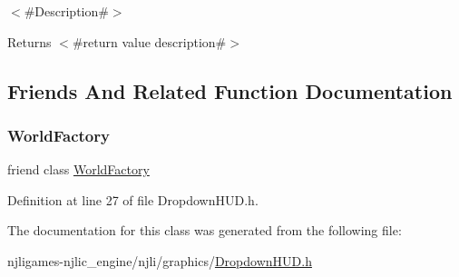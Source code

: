 $<$\#\+Description\#$>$

\begin{DoxyReturn}{Returns}
$<$\#return value description\#$>$ 
\end{DoxyReturn}


\subsection{Friends And Related Function Documentation}
\mbox{\label{classnjli_1_1_dropdown_h_u_d_acb96ebb09abe8f2a37a915a842babfac}} 
\subsubsection{\texorpdfstring{World\+Factory}{WorldFactory}}
{\footnotesize\ttfamily friend class \mbox{\hyperlink{classnjli_1_1_world_factory}{World\+Factory}}\hspace{0.3cm}{\ttfamily [friend]}}



Definition at line 27 of file Dropdown\+H\+U\+D.\+h.



The documentation for this class was generated from the following file\+:\begin{DoxyCompactItemize}
\item 
njligames-\/njlic\+\_\+engine/njli/graphics/\mbox{\hyperlink{_dropdown_h_u_d_8h}{Dropdown\+H\+U\+D.\+h}}\end{DoxyCompactItemize}
